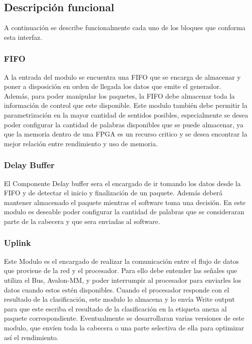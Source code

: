 \subsection{Descripción funcional}

A continuación se describe funcionalmente cada uno de los bloques que conforma esta interfaz.
\subsubsection{FIFO}
A la entrada del modulo se encuentra una FIFO que se encarga de almacenar y poner a disposición en orden de llegada los datos que emite el generador. Además, para poder manipular los paquetes, la FIFO debe almacenar toda la información de control que este disponible. 
Este modulo también debe permitir la parametrización en la mayor cantidad de sentidos posibles, especialmente se desea poder configurar la cantidad de palabras disponibles que se puede almacenar, ya que la memoria dentro de una FPGA es un recurso critico y se desea encontrar la mejor relación entre rendimiento y uso de memoria.


\subsubsection{Delay Buffer}
El Componente Delay buffer sera el encargado de ir tomando los datos desde la FIFO y de detectar el inicio y finalización de un paquete. Además deberá mantener almacenado el paquete mientras el software toma una decisión. En este modulo es deseable poder configurar la cantidad de palabras que se consideraran parte de la cabecera y que sera enviadas al software. 

\subsubsection{Uplink}
Este Modulo es el encargado de realizar la comunicación entre el flujo de datos que proviene de la red y el procesador. Para ello debe entender las señales que utiliza el Bus, Avalon-MM, y poder interrumpir al procesador para enviarles los datos cuando estos estén disponibles. Cuando el procesador responde con el resultado de la clasificación, este modulo lo almacena y lo envía  Write output para que este escriba el resultado de la clasificación en la etiqueta anexa al paquete correspondiente.
Eventualmente se desarrollaran varias versiones de este modulo, que envíen toda la cabecera o una parte selectiva de ella para optimizar así el rendimiento.

